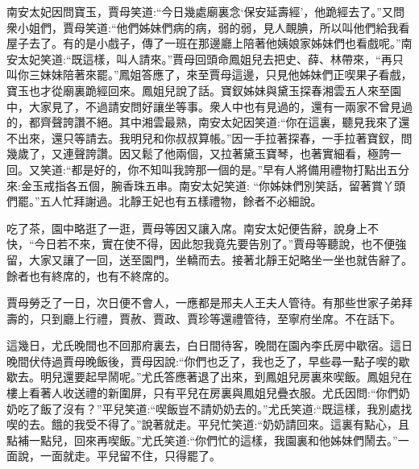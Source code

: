 \begin{parag}
    南安太妃因問寶玉，賈母笑道:“今日幾處廟裏念‘保安延壽經’，他跪經去了。”又問衆小姐們，賈母笑道:“他們姊妹們病的病，弱的弱，見人靦腆，所以叫他們給我看屋子去了。有的是小戲子，傳了一班在那邊廳上陪著他姨娘家姊妹們也看戲呢。”南安太妃笑道:“既這樣，叫人請來。”賈母回頭命鳳姐兒去把史、薛、林帶來，“再只叫你三妹妹陪著來罷。”鳳姐答應了，來至賈母這邊，只見他姊妹們正喫果子看戲，寶玉也才從廟裏跪經回來。鳳姐兒說了話。寶釵姊妹與黛玉探春湘雲五人來至園中，大家見了，不過請安問好讓坐等事。衆人中也有見過的，還有一兩家不曾見過的，都齊聲誇讚不絕。其中湘雲最熟，南安太妃因笑道:“你在這裏，聽見我來了還不出來，還只等請去。我明兒和你叔叔算帳。”因一手拉著探春，一手拉著寶釵，問幾歲了，又連聲誇讚。因又鬆了他兩個，又拉著黛玉寶琴，也著實細看，極誇一回。又笑道:“都是好的，你不知叫我誇那一個的是。”早有人將備用禮物打點出五分來:金玉戒指各五個，腕香珠五串。南安太妃笑道: “你姊妹們別笑話，留著賞丫頭們罷。”五人忙拜謝過。北靜王妃也有五樣禮物，餘者不必細說。
\end{parag}


\begin{parag}
    吃了茶，園中略逛了一逛，賈母等因又讓入席。南安太妃便告辭，說身上不快，“今日若不來，實在使不得，因此恕我竟先要告別了。”賈母等聽說，也不便強留，大家又讓了一回，送至園門，坐轎而去。接著北靜王妃略坐一坐也就告辭了。餘者也有終席的，也有不終席的。
\end{parag}


\begin{parag}
    賈母勞乏了一日，次日便不會人，一應都是邢夫人王夫人管待。有那些世家子弟拜壽的，只到廳上行禮，賈赦、賈政、賈珍等還禮管待，至寧府坐席。不在話下。
\end{parag}


\begin{parag}
    這幾日，尤氏晚間也不回那府裏去，白日間待客，晚間在園內李氏房中歇宿。這日晚間伏侍過賈母晚飯後，賈母因說:“你們也乏了，我也乏了，早些尋一點子喫的歇歇去。明兒還要起早鬧呢。”尤氏答應著退了出來，到鳳姐兒房裏來喫飯。鳳姐兒在樓上看著人收送禮的新圍屏，只有平兒在房裏與鳳姐兒疊衣服。尤氏因問:“你們奶奶吃了飯了沒有？”平兒笑道:“喫飯豈不請奶奶去的。”尤氏笑道:“既這樣，我別處找喫的去。餓的我受不得了。”說著就走。平兒忙笑道:“奶奶請回來。這裏有點心，且點補一點兒，回來再喫飯。”尤氏笑道:“你們忙的這樣，我園裏和他姊妹們鬧去。”一面說，一面就走。平兒留不住，只得罷了。
\end{parag}


